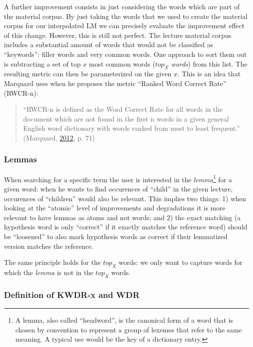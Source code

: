 \documentclass[]{article}
\begin{document}
A further improvement consists in just considering the words which are
part of the material corpus. By just taking the words that we used to
create the material corpus for our interpolated LM we can precisely
evaluate the improvement effect of this change. However, this is still
not perfect. The lecture material corpus includes a substantial amount
of words that would not be classified as ``keywords'': filler words and
very common words. One approach to sort them out is subtracting a set of
top \(x\) most common words (\emph{\(top_X\) words}) from this list. The
resulting metric can then be parameterized on the given \(x\). This is
an idea that Marquard uses when he proposes the metric ``Ranked Word
Correct Rate'' (RWCR-n):

\begin{quote}
``RWCR-n is defined as the Word Correct Rate for all words in the
document which are not found in the first n words in a given general
English word dictionary with words ranked from most to least frequent.''
(Marquard, \hyperref[ref-marquard]{2012}, p. 71)
\end{quote}

\subsubsection{Lemmas}\label{lemmas}

When searching for a specific term the user is interested in the
\emph{lemma}\footnote{A lemma, also called ``headword'', is the
  canonical form of a word that is chosen by convention to represent a
  group of lexemes that refer to the same meaning. A typical use would
  be the key of a dictionary entry.} for a given word: when he wants to
find occurences of ``child'' in the given lecture, occurences of
``children'' would also be relevant. This implies two things: 1) when
looking at the ``atomic'' level of improvements and degradations it is
more relevant to have lemmas as atoms and not words; and 2) the exact
matching (a hypothesis word is only ``correct'' if it exactly matches
the reference word) should be ``loosened'' to also mark hypothesis words
as correct if their lemmatized version matches the reference.

The same principle holds for the \(top_X\) words: we only want to
capture words for which the \emph{lemma} is not in the \(top_X\) words.

\subsubsection{Definition of KWDR-x and
WDR}\label{definition-of-kwdr-x-and-wdr}
\end{document}
